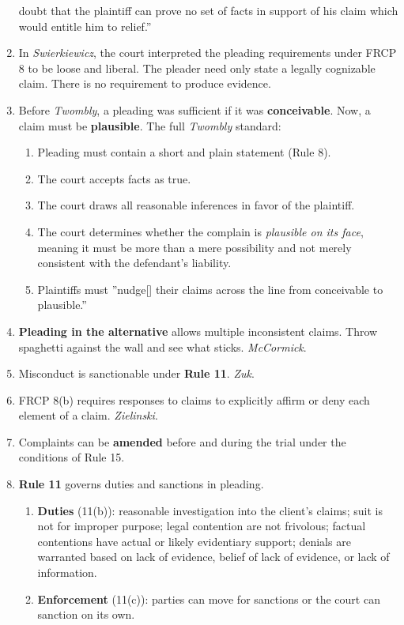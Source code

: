 \begin{enumerate}
    doubt that the plaintiff can prove no set of facts in support of his claim 
    which would entitle him to relief.''
    \item In \emph{Swierkiewicz}, the court interpreted the pleading 
    requirements under FRCP 8 to be loose and liberal. The pleader need only 
    state a legally cognizable claim. There is no requirement to produce 
    evidence.
    \item Before \emph{Twombly}, a pleading was sufficient if it was 
    \textbf{conceivable}. Now, a claim must be \textbf{plausible}. The full 
    \emph{Twombly} standard:
    \begin{enumerate}
        \item Pleading must contain a short and plain statement (Rule 8).
        \item The court accepts facts as true.
        \item The court draws all reasonable inferences in favor of the 
        plaintiff.
        \item The court determines whether the complain is \emph{plausible on 
        its face}, meaning it must be more than a mere possibility and not 
        merely consistent with the defendant's liability.
        \item Plaintiffs must ''nudge[] their claims across the line from 
        conceivable to plausible.''
    \end{enumerate}
    \item \textbf{Pleading in the alternative} allows multiple inconsistent 
    claims. Throw spaghetti against the wall and see what sticks. 
    \emph{McCormick}.
    \item Misconduct is sanctionable under \textbf{Rule 11}. \emph{Zuk}.
    \item FRCP 8(b) requires responses to claims to explicitly affirm or deny 
    each element of a claim. \emph{Zielinski}.
    \item Complaints can be \textbf{amended} before and during the trial under 
    the conditions of Rule 15.
    \item \textbf{Rule 11} governs duties and sanctions in pleading.
    \begin{enumerate}
        \item \textbf{Duties} (11(b)): reasonable investigation into the client's 
        claims; suit is not for improper purpose; legal contention are not 
        frivolous; factual contentions have actual or likely evidentiary 
        support; denials are warranted based on lack of evidence, belief of 
        lack of evidence, or lack of information.
        \item \textbf{Enforcement} (11(c)): parties can move for sanctions or the 
        court can sanction on its own.
    \end{enumerate}
\end{enumerate}

